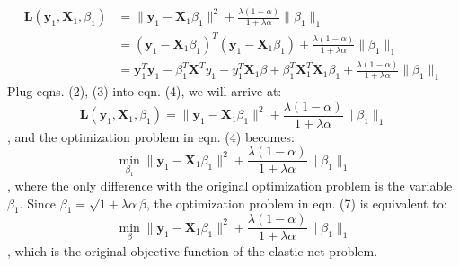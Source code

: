 \documentclass[11pt]{article}
\newcommand{\mtx}[1]{\mathbf{#1}}
\newcommand{\vct}[1]{\mathbf{#1}}
\def \mL {\mtx{L}}
\def \mX {\mtx{X}}
\def \vy {\vct{y}}
\begin{document}
\begin{enumerate}
	\begin{equation}
		\begin{aligned}
			\mL(\vy_1,\mX_1,\beta_1) &= \|\vy_1-\mX_1\beta_1\|^2 + \frac{\lambda(1-\alpha)}{1+\lambda\alpha}\|\beta_1\|_1 \\
			&= (\vy_1-\mX_1\beta_1)^T(\vy_1-\mX_1\beta_1)+\frac{\lambda(1-\alpha)}{1+\lambda\alpha}\|\beta_1\|_1\\
			&= \vy_1^T\vy_1-\beta_1^T\mX^Ty_1-y_1^T\mX_1\beta+\beta_1^T\mX_1^T\mX_1\beta_1 + \frac{\lambda(1-\alpha)}{1+\lambda\alpha}\|\beta_1\|_1
		\end{aligned}
	\end{equation}
	Plug eqns. (2), (3) into eqn. (4), we will arrive at:
	\begin{equation}
	\mL(\vy_1,\mX_1,\beta_1) = \|\vy_1-\mX_1\beta_1\|^2 + \frac{\lambda(1-\alpha)}{1+\lambda\alpha}\|\beta_1\|_1 
	\end{equation}, and the optimization problem in eqn. (4) becomes: 
\begin{equation}
	\min_{\beta_1} \|\vy_1-\mX_1\beta_1\|^2 + \frac{\lambda(1-\alpha)}{1+\lambda\alpha}\|\beta_1\|_1 
\end{equation}, where the only difference with the original optimization problem is the variable $\beta_1$. Since $\beta_1=\sqrt{1+\lambda\alpha}\beta$, the optimization problem in eqn. (7) is equivalent to:
	\begin{equation}
		\min_{\beta} \|\vy_1-\mX_1\beta_1\|^2 + \frac{\lambda(1-\alpha)}{1+\lambda\alpha}\|\beta_1\|_1
	\end{equation}, which is the original objective function of the elastic net problem.


\end{enumerate}
\end{document}
